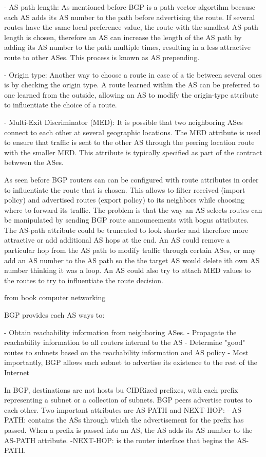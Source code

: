 \documentclass[11pt,a4paper]{scrreprt}
\begin{document}
- AS path length: As mentioned before BGP is a path vector algortihm because each AS adds its AS number to the path before advertising the route. If several routes have the same local-preference value, the route with the smallest AS-path length is chosen, therefore an AS can increase the length of the AS path by adding its AS number to the path multiple times, resulting in a less attractive route to other ASes. This process is known as AS prepending.

- Origin type: Another way to choose a route in case of a tie between several ones is by checking the origin type. A route learned within the AS can be preferred to one learned from the outside, allowing an AS to modify the origin-type attribute to influentiate the choice of a route.

- Multi-Exit Discriminator (MED): It is possible that two neighboring ASes connect to each other at several geographic locations. The MED attribute is used to ensure that traffic is sent to the other AS through the peering location route with the smaller MED. This attribute is typically specified as part of the contract betwwen the ASes.


As seen before BGP routers can can be configured with route attributes in order to influentiate the route that is chosen. This allows to filter received (import policy) and advertised routes (export policy) to its neighbors while choosing where to forward its traffic. The problem is that the way an AS selects routes can be manipulated by sending BGP route announcements with bogus attributes. The AS-path attribute could be truncated to look shorter and therefore more attractive or add additional AS hops at the end. An AS could remove a particular hop from the AS path to modify traffic through certain ASes, or may add an AS number to the AS path so the the target AS would delete ith own AS number thinking it was a loop. An AS could also try to attach MED values to the routes to try to influentiate the route decision. 

from book computer networking

BGP provides each AS ways  to:

- Obtain reachability information from neighboring ASes.
- Propagate the reachability information to all routers internal to the AS
- Determine "good" routes to subnets based on the reachability information and AS policy
- Most importantly, BGP allows each subnet to advertise its existence to the rest of the Internet

In BGP, destinations are not hosts bu CIDRized prefixes, with each prefix representing a subnet or a collection of subnets. BGP peers advertise routes to each other. Two important attributes are AS-PATH and NEXT-HOP:
 - AS-PATH: contains the ASs through which the advertisement for the prefix has passed. When a prefix is passed into an AS, the AS adds its AS number to the AS-PATH attribute.
 -NEXT-HOP: is the router interface that begins the AS-PATH. 
\end{document}
